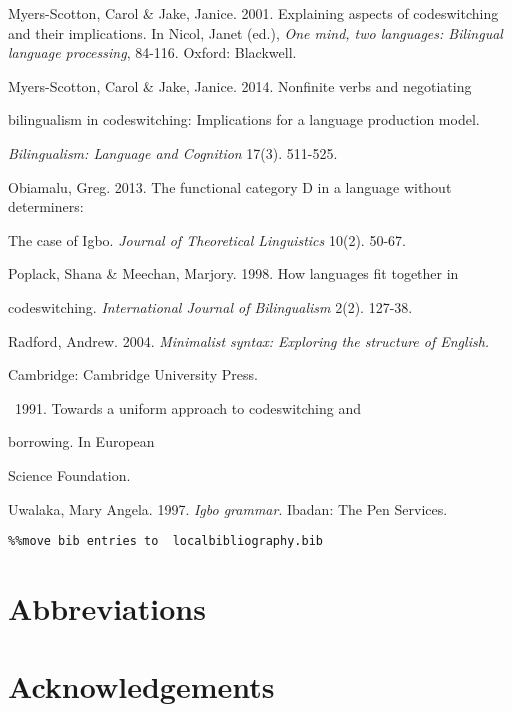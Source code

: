 \documentclass[output=paper]{langsci/langscibook}
\begin{document}
Myers-Scotton, Carol \& Jake, Janice. 2001. Explaining aspects of codeswitching and their implications. In Nicol, Janet (ed.), \textit{One mind, two languages: Bilingual language processing}, 84-116. Oxford: Blackwell.{~}


Myers-Scotton, Carol \& Jake, Janice. 2014. Nonfinite verbs and negotiating 

  bilingualism in codeswitching: Implications for a language production model. 

  \textit{Bilingualism: Language and Cognition} 17(3). 511-525. 


Obiamalu, Greg. 2013. The functional category D in a language without determiners:



The case of Igbo. \textit{Journal of Theoretical Linguistics }10(2). 50-67. 



Poplack, Shana \& Meechan, Marjory. 1998. How languages fit together in 



codeswitching. \textit{International Journal of Bilingualism} 2(2). 127-38. 



Radford, Andrew. 2004. \textit{Minimalist syntax: Exploring the structure of English. }



Cambridge: Cambridge University Press. 


\href{http://centaur.reading.ac.uk/view/creators/90004056.html}{}{~}1991. Towards a uniform approach to codeswitching and 

borrowing. In European 

Science Foundation. 

Uwalaka, Mary Angela. 1997. \textit{Igbo grammar}. Ibadan: The Pen Services.


\begin{verbatim}%%move bib entries to  localbibliography.bib
\end{verbatim}

\section*{Abbreviations}
\section*{Acknowledgements}

\printbibliography[heading=subbibliography,notkeyword=this]
\end{document}
